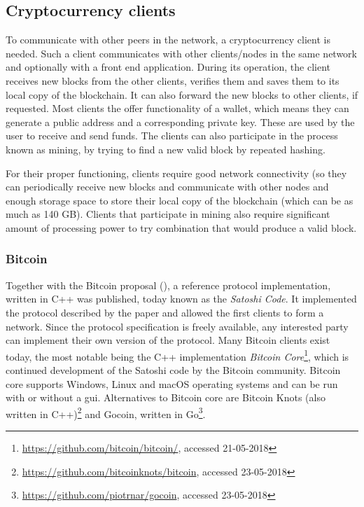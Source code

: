\subsection{Cryptocurrency clients}\label{sec:eth-clients}
To communicate with other peers in the network, a cryptocurrency client is needed. Such a client communicates with other clients/nodes in the same network and optionally with a front end application. During its operation, the client receives new blocks from the other clients, verifies them and saves them to its local copy of the blockchain. It can also forward the new blocks to other clients, if requested. Most clients the offer functionality of a wallet, which means they can generate a public address and a corresponding private key. These are used by the user to receive and send funds. The clients can also participate in the process known as mining, by trying to find a new valid block by repeated hashing.

For their proper functioning, clients require good network connectivity (so they can periodically receive new blocks and communicate with other nodes and enough storage space to store their local copy of the blockchain (which can be as much as 140 GB\footnotemark). Clients that participate in mining also require significant amount of processing power to try combination that would produce a valid block.
% 

\subsubsection{Bitcoin}
Together with the Bitcoin proposal (\cite{NakamotoBitcoin:System}), a reference protocol implementation, written in C++ was published, today known as the \textit{Satoshi Code}\footnotemark. It implemented the protocol described by the paper and allowed the first clients to form a network. Since the protocol specification is freely available, any interested party can implement their own version of the protocol.
% 
% 
Many Bitcoin clients exist today, the most notable being the C++ implementation \textit{Bitcoin Core}\footnote{\url{https://github.com/bitcoin/bitcoin/}, accessed 21-05-2018}, which is continued development of the Satoshi code by the Bitcoin community. Bitcoin core supports Windows, Linux and macOS operating systems and can be run with or without a \acrshort{gui}. Alternatives to Bitcoin core are Bitcoin Knots (also written in C++)\footnote{\url{https://github.com/bitcoinknots/bitcoin}, accessed 23-05-2018} and Gocoin, written in Go\footnote{\url{https://github.com/piotrnar/gocoin}, accessed 23-05-2018}.

